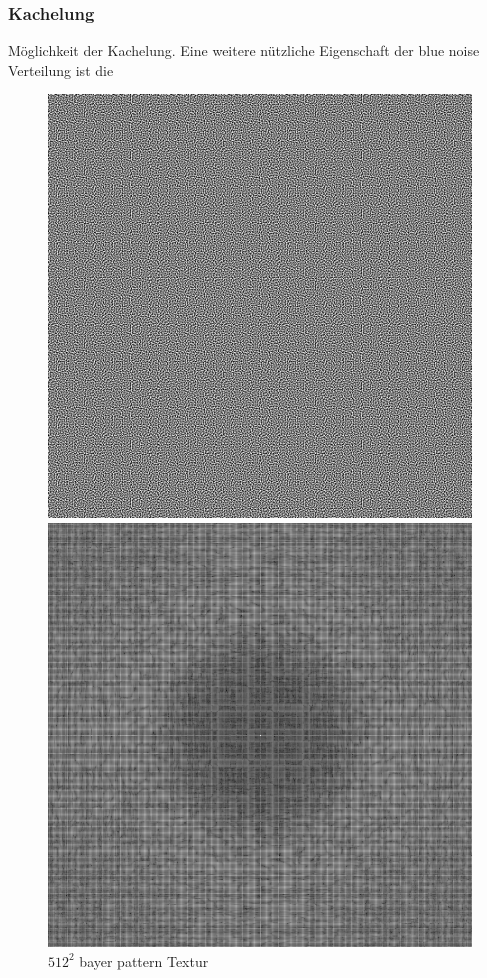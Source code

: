 \subsubsection{Kachelung}
Möglichkeit der Kachelung. 
Eine weitere nützliche Eigenschaft der blue noise Verteilung ist die 
\begin{figure}[H]\label{pic:tiledBlueNoiseFFT}
    \centering
    \begin{minipage}[t]{0.45\linewidth}
        \centering
        \includegraphics[width=\linewidth]{content/BlueNoise/Bilder/BlueNoise64Tiled.png}
        \caption{$512^{2}$ bayer pattern Textur}
    \end{minipage}
    \hfill
    \begin{minipage}[t]{0.45\linewidth}
        \centering
        \includegraphics[width=\linewidth]{content/BlueNoise/Bilder/FFT_BlueNoise64Tiled.png}

\end{minipage}
\end{figure}
